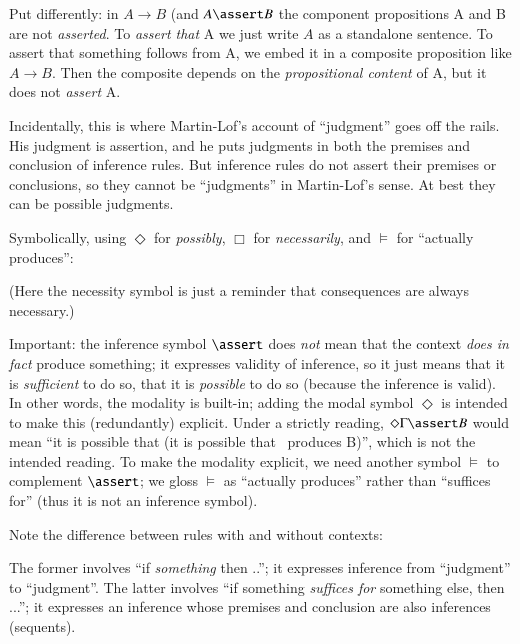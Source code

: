 Put differently: in \(A\rightarrow B\) (and \(A\linfer B\) the
component propositions A and B are not \textit{asserted}. To
\textit{assert that} A we just write \(A\) as a standalone sentence.
To assert that something follows from A, we embed it in a composite
proposition like \(A\rightarrow B\). Then the composite depends on the
\textit{propositional content} of A, but it does not \textit{assert}
A.

Incidentally, this is where Martin-Lof's account of ``judgment'' goes
off the rails. His judgment is assertion, and he puts judgments in
both the premises and conclusion of inference rules. But inference
rules do not assert their premises or conclusions, so they cannot be
``judgments'' in Martin-Lof's sense. At best they can be possible
judgments.

Symbolically, using \( \Diamond \) for \textit{possibly}, \(\Box\)
for \textit{necessarily}, and \(\models\) for ``actually produces'':


(Here the necessity symbol is just a reminder that consequences are
always necessary.)

Important: the inference symbol \(\linfer\) does \textit{not} mean that
the context \textit{does in fact} produce something; it expresses
validity of inference, so it just means that it is \textit{sufficient}
to do so, that it is \textit{possible} to do so (because the inference
is valid). In other words, the modality is built-in; adding the modal
symbol \(\Diamond\) is intended to make this (redundantly) explicit.
Under a strictly reading, \(\Diamond\Gamma\linfer B\) would mean ``it
is possible that (it is possible that \Gamma\ produces B)'', which is
not the intended reading. To make the modality explicit, we need
another symbol \(\models\) to complement \(\linfer\); we gloss
\(\models\) as ``actually produces'' rather than ``suffices for''
(thus it is not an inference symbol).

Note the difference between rules with and without contexts:



The former involves ``if \textit{something} then ..''; it expresses
inference from ``judgment'' to ``judgment''. The latter involves ``if
something \textit{suffices for} something else, then ...''; it
expresses an inference whose premises and conclusion are also
inferences (sequents).

